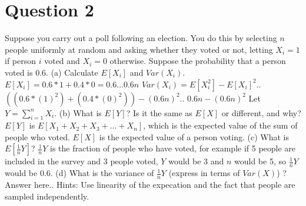 \documentclass[12pt]{report}
\begin{document}
\section{Question 2}
Suppose you carry out a poll following an election. You do this by selecting $n$ people uniformly at random and asking whether they voted or not, letting $X_i = 1$ if person $i$ voted and $X_i = 0$ otherwise. Suppose the probability that a person voted is $0.6$.
\newline
\newline
(a) Calculate $E[X_i]$ and $Var(X_i)$.
\newline
$E[X_i] = 0.6 * 1 + 0.4 * 0 = 0.6... 0.6n$
\newline
$Var(X_i) = E[X_i^2] - E[X_i]^2$..
\newline
$((0.6 * (1)^2) + (0.4 * (0)^2)) - (0.6n)^2$..
\newline
$0.6n - (0.6n)^2$
\newline
\newline
Let $Y = \sum\limits_{i=1}^n X_i$.
\newline
(b) What is $E[Y]$? Is it the same as $E[X]$ or different, and why?
\newline
$E[Y]$ is $E[X_1 + X_2 + X_3 + ... + X_n]$, which is the expected value of the sum of people who voted. $E[X]$ is the expected value of a person voting. 
\newline
\newline
(c) What is $E[\frac{1}{n} Y]$?
\newline
$\frac{1}{n} Y$ is the fraction of people who have voted, for example if 5 people are included in the survey and 3 people voted, $Y$ would be 3 and $n$ would be 5, so $\frac{1}{n} Y$ would be 0.6. 
\newline
\newline
(d) What is the variance of $\frac{1}{n} Y$ (express in terms of $Var(X)$) ?
\newline
Answer here..
\newline
\newline
Hints: Use linearity of the expecation and the fact that people are sampled independently.
\end{document}
